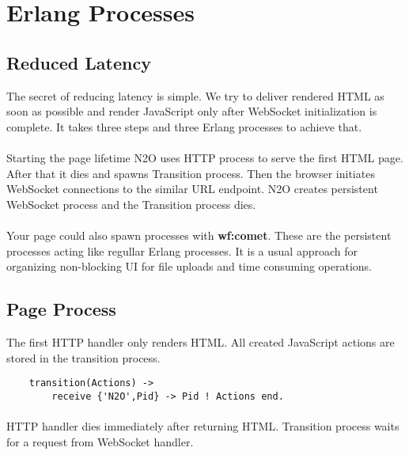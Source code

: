 \section{Erlang Processes}

\subsection{Reduced Latency}
The secret of reducing latency is simple. We try to deliver rendered HTML
as soon as possible and render JavaScript only after WebSocket initialization is complete.
It takes three steps and three Erlang processes to achieve that.


\paragraph{}
Starting the page lifetime N2O uses HTTP process to serve the first HTML page.
After that it dies and spawns Transition process.
Then the browser initiates WebSocket connections to the similar URL endpoint.
N2O creates persistent WebSocket process and the Transition process dies.

\paragraph{}
Your page could also spawn processes with {\bf wf:comet}.
These are the persistent processes acting like regullar Erlang processes.
It is a usual approach for organizing non-blocking UI for file uploads and time consuming operations.

\subsection{Page Process}
The first HTTP handler only renders HTML. All created
JavaScript actions are stored in the transition process.

\vspace{1\baselineskip}
\begin{lstlisting}
    transition(Actions) ->
        receive {'N2O',Pid} -> Pid ! Actions end.
\end{lstlisting}

\paragraph{}
HTTP handler dies immediately after returning HTML. Transition process
waits for a request from WebSocket handler.

